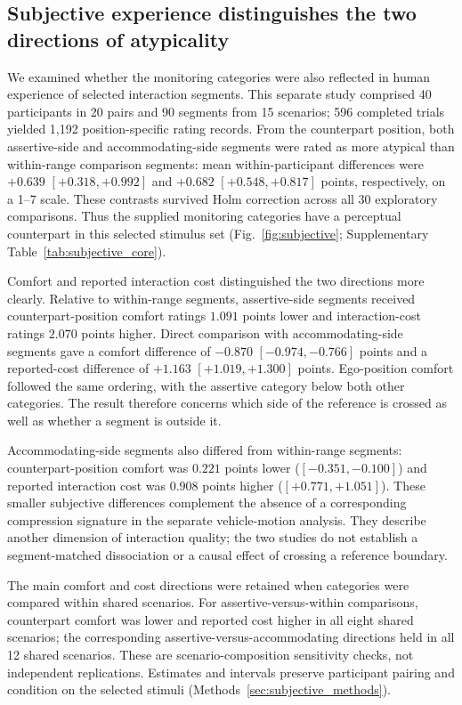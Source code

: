 \documentclass[12pt,a4paper]{article}
\begin{document}
\subsection{Subjective experience distinguishes the two directions of atypicality}
\label{sec:subjective_results}
We examined whether the monitoring categories were also reflected in human experience of selected
interaction segments. This separate study comprised 40 participants in 20 pairs and 90 segments
from 15 scenarios; 596 completed trials yielded 1{,}192 position-specific rating records. From the
counterpart position, both assertive-side and accommodating-side segments were rated as more
atypical than within-range comparison segments: mean within-participant differences were
$+0.639$ $[+0.318,+0.992]$ and $+0.682$ $[+0.548,+0.817]$ points, respectively, on a 1--7 scale.
These contrasts survived Holm correction across all 30 exploratory comparisons. Thus the supplied
monitoring categories have a perceptual counterpart in this selected stimulus set
(Fig.~\ref{fig:subjective}; Supplementary Table~\ref{tab:subjective_core}).

Comfort and reported interaction cost distinguished the two directions more clearly. Relative to
within-range segments, assertive-side segments received counterpart-position comfort ratings
$1.091$ points lower and interaction-cost ratings $2.070$ points higher. Direct comparison with
accommodating-side segments gave a comfort difference of $-0.870$ $[-0.974,-0.766]$ points and a
reported-cost difference of $+1.163$ $[+1.019,+1.300]$ points. Ego-position comfort followed the same
ordering, with the assertive category below both other categories. The result therefore concerns
which side of the reference is crossed as well as whether a segment is outside it.

Accommodating-side segments also differed from within-range segments: counterpart-position comfort
was $0.221$ points lower ($[-0.351,-0.100]$) and reported interaction cost was $0.908$ points higher
($[+0.771,+1.051]$). These smaller subjective differences complement the absence of a corresponding
compression signature in the separate vehicle-motion analysis. They describe another dimension of
interaction quality; the two studies do not establish a segment-matched dissociation or a causal
effect of crossing a reference boundary.

The main comfort and cost directions were retained when categories were compared within shared
scenarios. For assertive-versus-within comparisons, counterpart comfort was lower and reported cost
higher in all eight shared scenarios; the corresponding assertive-versus-accommodating directions
held in all 12 shared scenarios. These are scenario-composition sensitivity checks, not independent
replications. Estimates and intervals preserve participant pairing and condition on the selected
stimuli (Methods~\ref{sec:subjective_methods}).
\end{document}
